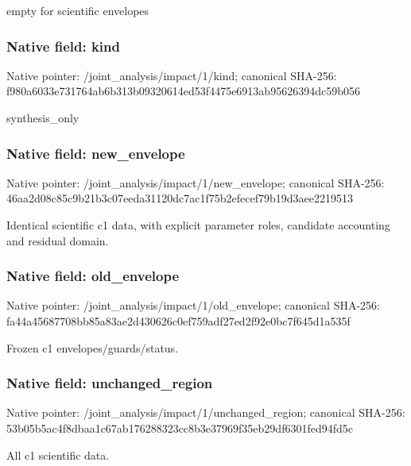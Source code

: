 \documentclass[10pt,a4paper]{article}
\begin{document}
\begingroup\raggedright\sloppy empty for scientific envelopes\par\endgroup

\subsubsection{Native field: kind}
Native pointer: /joint\_\allowbreak{}analysis/impact/1/kind; canonical SHA-256: f980a6033e731764ab6b313b09320614ed53f4475e6913ab95626394dc59b056

\begingroup\raggedright\sloppy synthesis\_\allowbreak{}only\par\endgroup

\subsubsection{Native field: new\_\allowbreak{}envelope}
Native pointer: /joint\_\allowbreak{}analysis/impact/1/new\_\allowbreak{}envelope; canonical SHA-256: 46aa2d08c85c9b21b3c07eeda31120dc7ac1f75b2efecef79b19d3aee2219513

\begingroup\raggedright\sloppy Identical scientific c1 data,\allowbreak{} with explicit parameter roles,\allowbreak{} candidate accounting and residual domain.\par\endgroup

\subsubsection{Native field: old\_\allowbreak{}envelope}
Native pointer: /joint\_\allowbreak{}analysis/impact/1/old\_\allowbreak{}envelope; canonical SHA-256: fa44a45687708bb85a83ae2d430626c0ef759adf27ed2f92e0bc7f645d1a535f

\begingroup\raggedright\sloppy Frozen c1 envelopes/\allowbreak{}guards/\allowbreak{}status.\par\endgroup

\subsubsection{Native field: unchanged\_\allowbreak{}region}
Native pointer: /joint\_\allowbreak{}analysis/impact/1/unchanged\_\allowbreak{}region; canonical SHA-256: 53b05b5ac4f8dbaa1c67ab176288323cc8b3e37969f35eb29df6301fed94fd5c

\begingroup\raggedright\sloppy All c1 scientific data.\par\endgroup
\end{document}
